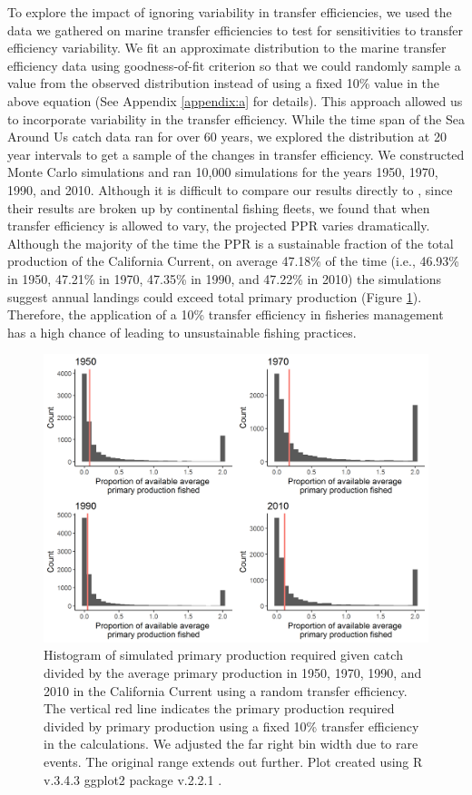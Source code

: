 \documentclass[oneside,12pt,final]{sty/ucthesis-CA2012}
\let\cite\citep                             %
\begin{document}
\begin{mainmatter}
To explore the impact of ignoring variability in transfer efficiencies, we used the data we gathered on marine transfer efficiencies to test for sensitivities to transfer efficiency variability. We fit an approximate distribution to the marine transfer efficiency data using goodness-of-fit criterion so that we could randomly sample a value from the observed distribution instead of using a fixed 10\% value in the above equation (See Appendix \ref{appendix:a} for details). This approach allowed us to incorporate variability in the transfer efficiency. While the time span of the Sea Around Us catch data ran for over 60 years, we explored the distribution at 20 year intervals to get a sample of the changes in transfer efficiency. We constructed Monte Carlo simulations and ran 10,000 simulations for the years 1950, 1970, 1990, and 2010. Although it is difficult to compare our results directly to \citet{watson2014primary}, since their results are broken up by continental fishing fleets, we found that when transfer efficiency is allowed to vary, the projected PPR varies dramatically. Although the majority of the time the PPR is a sustainable fraction of the total production of the California Current, on average 47.18\% of the time (i.e., 46.93\% in 1950, 47.21\% in 1970, 47.35\% in 1990, and 47.22\% in 2010) the simulations suggest annual landings could exceed total primary production (Figure \ref{ppr}). Therefore, the application of a 10\% transfer efficiency in fisheries management has a high chance of leading to unsustainable fishing practices. 

\begin{figure}[H]
     \centering
       \includegraphics[width=.8\textwidth]{fig/hist_pp_1950_2010}
    \caption{Histogram of simulated primary production required given catch divided by the average primary production in 1950, 1970, 1990, and 2010 in the California Current using a random transfer efficiency. The vertical red line indicates the primary production required divided by primary production using a fixed 10\% transfer efficiency in the calculations. We adjusted the far right bin width due to rare events. The original range extends out further. Plot created using R v.3.4.3 \cite{Rcite} ggplot2 package v.2.2.1 \cite{ggplot}. }
    \label{ppr}
\end{figure}


\end{mainmatter}
\end{document}

